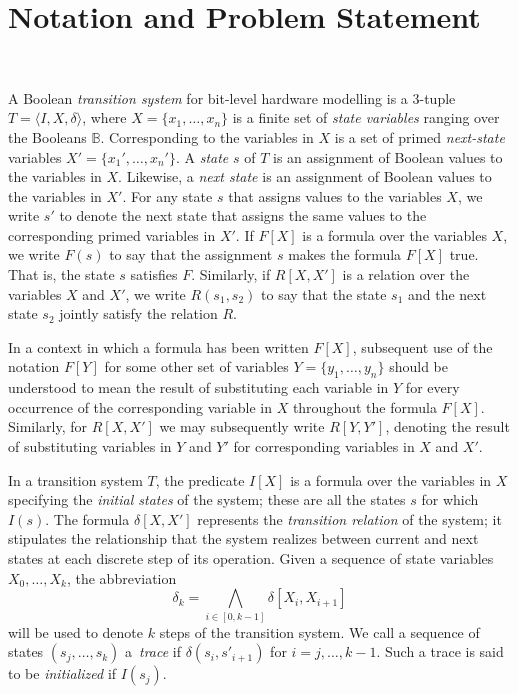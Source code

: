 \section{Notation and Problem Statement}~\label{sec:notation}

A Boolean \textit{transition system} for bit-level hardware
modelling is a 3-tuple $T = \langle I,X,\delta \rangle$, where $X = \{x_1,\dots ,x_n\}$
is a finite set of \textit{state variables} ranging over the Booleans $\mathbb{B}$. 
Corresponding to the variables in $X$ is a set of primed \textit{next-state} variables  $X' = \{x_1', \dots, x_n'\}$.
A \textit{state} $s$ of $T$ is an assignment of Boolean values to the variables in $X$. Likewise, a \textit{next state} is an assignment of Boolean values to the variables in $X'$.  For any state $s$ that assigns values to the  variables $X$, we write $s'$ to denote the next state that assigns the same values to the corresponding primed variables in $X'$. If $F[X]$ is a formula over the variables $X$, we write $F(s)$ to say that
the assignment $s$ makes the formula $F[X]$ true. That is, the state $s$ satisfies $F$. Similarly, if $R[X,X']$ is a relation over the variables $X$ and $X'$, we write $R(s_1,s_2)$ to say that the state $s_1$ and the next state $s_2$ jointly satisfy the relation $R$. 

In a context in which a formula has been written $F[X]$, subsequent use of the notation $F[Y]$ for
some other set of variables $Y = \{y_1, \dots, y_n\}$ should be understood to mean the
result of substituting each variable in $Y$ for every occurrence of the corresponding variable in $X$ throughout the formula $F[X]$. Similarly, for $R[X,X']$ we may subsequently write $R[Y,Y']$, denoting the result of substituting variables in $Y$ and $Y'$ for corresponding variables in $X$ and $X'$.

In a transition system $T$, the predicate $I[X]$ is a formula over the variables in 
$X$ specifying the \textit{initial states} of the system; these are all the states 
$s$ for which $I(s)$. The formula $\delta[X,X']$ represents the \textit{transition relation} of the system; it stipulates the relationship that the system
realizes between current and next states at each discrete step of its operation.
Given a sequence of state variables $X_0, \dots, X_k$, the abbreviation \[ \delta_k = \underset{i \in [0,k-1]}{\bigwedge} \delta[X_i, X_{i+1}]\] 
will be used to denote $k$ steps of the transition system.
We call a sequence of states $(s_j,\dots,s_k)$ a~\textit{trace}
if $\delta(s_i,s'_{i{+}1})$ for $i=j,\dots,k-1$.  Such a trace is
said to be \textit{initialized} if $I(s_j)$.
  

